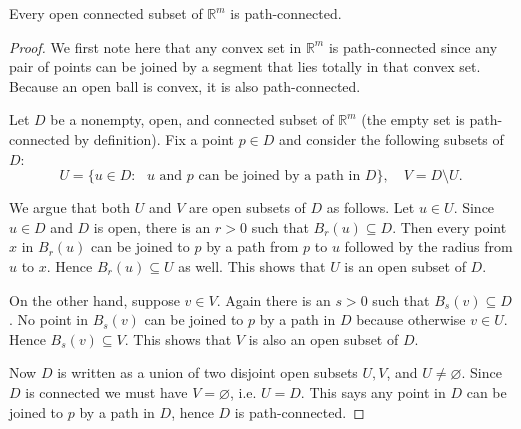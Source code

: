 \begin{thm}
  Every open connected subset of $\mathbb{R}^m$ is path-connected.
\end{thm}

\begin{proof}
  We first note here that any convex set in $\mathbb{R}^m$ is path-connected since any pair of points can be joined by a segment that lies totally in that convex set.
  Because an open ball is convex, it is also path-connected.

  Let $D$ be a nonempty, open, and connected subset of $\mathbb{R}^m$ (the empty set is path-connected by definition).
  Fix a point $p \in D$ and consider the following subsets of $D$:
  \[
    U = \{ u \in D \colon \text{ $u$ and $p$ can be joined by a path in $D$} \}, \quad V = D \setminus U.
  \]

  We argue that both $U$ and $V$ are open subsets of $D$ as follows.
  Let $u \in U$.  Since $u \in D$ and $D$ is open, there is an $r > 0$ such that $B_r(u) \subseteq D$.  Then every point $x$ in $B_r(u)$ can be joined to $p$ by a path from $p$ to $u$ followed by the radius from $u$ to $x$.
  Hence $B_r(u) \subseteq U$ as well.  This shows that $U$ is an open subset of $D$.

  On the other hand, suppose $v \in V$.  Again there is an $s > 0$ such that $B_s(v) \subseteq D$.
  No point in $B_s(v)$ can be joined to $p$ by a path in $D$ because otherwise $v \in U$.  Hence $B_s(v) \subseteq V$.
  This shows that $V$ is also an open subset of $D$.

  Now $D$ is written as a union of two disjoint open subsets $U, V$, and $U \ne \varnothing$.
  Since $D$ is connected we must have $V = \varnothing$, i.e. $U = D$.
  This says any point in $D$ can be joined to $p$ by a path in $D$, hence $D$ is path-connected.
\end{proof}
